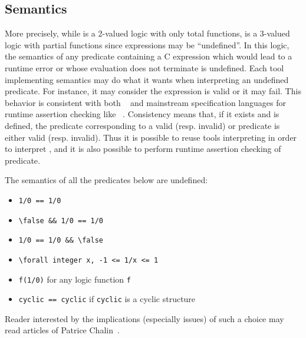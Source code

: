 
\subsection{Semantics}
\label{sec:twovaluedlogic}


More precisely, while \acsl is a 2-valued logic with only total
functions, \eacsl is a 3-valued logic with partial functions since
expressions may be ``undefined''. In this logic, the semantics of any
predicate containing a C expression which would lead to a runtime
error or whose evaluation does not terminate is undefined. Each tool
implementing \eacsl semantics may do what it wants when interpreting
an undefined predicate. For instance, it may consider the expression
is valid or it may fail. This behavior is consistent with both
\acsl~\cite{acsl} and mainstream specification languages for runtime
assertion checking like \jml~\cite{jml}. Consistency means that, if it
exists and is defined, the \eacsl predicate corresponding to a valid
(resp. invalid) \acsl or \jml predicate is either valid
(resp. invalid). Thus it is possible to reuse tools interpreting \acsl
in order to interpret \eacsl, and it is also possible to perform
runtime assertion checking of \eacsl predicate.

\begin{example}
The semantics of all the predicates below are undefined:
\begin{itemize}
\item \lstinline|1/0 == 1/0|
\item \lstinline|\false && 1/0 == 1/0|
\item \lstinline|1/0 == 1/0 && \false|
\item \lstinline|\forall integer x, -1 <= 1/x <= 1|
\item \lstinline|f(1/0)| for any logic function \lstinline|f|
\item \lstinline|cyclic == cyclic| if \lstinline|cyclic| is a cyclic \C
  structure
\end{itemize}
\end{example}

Reader interested by the implications (especially issues)
of such a choice may read articles of Patrice Chalin~\cite{chalin05,chalin07}.


